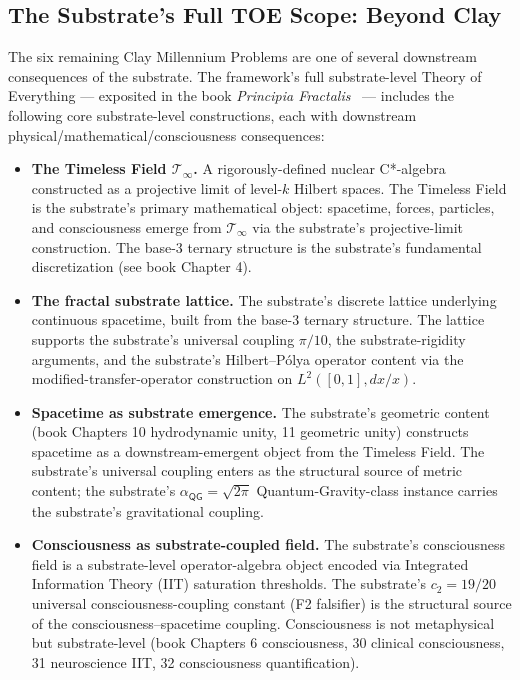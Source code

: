 \documentclass[11pt,a4paper]{amsart}
\theoremstyle{plain}
\theoremstyle{definition}
\begin{document}
\subsection{The Substrate's Full TOE Scope: Beyond Clay}\label{subsec:full-toe-scope}

The six remaining Clay Millennium Problems are one of several downstream consequences of the substrate. The framework's full substrate-level Theory of Everything --- exposited in the book \emph{Principia Fractalis}~\cite{cohen2026book} --- includes the following core substrate-level constructions, each with downstream physical/mathematical/consciousness consequences:

\begin{itemize}[itemsep=4pt,leftmargin=2em]
\item \textbf{The Timeless Field $\mathcal{T}_\infty$.} A rigorously-defined nuclear C*-algebra constructed as a projective limit of level-$k$ Hilbert spaces. The Timeless Field is the substrate's primary mathematical object: spacetime, forces, particles, and consciousness emerge from $\mathcal{T}_\infty$ via the substrate's projective-limit construction. The base-3 ternary structure is the substrate's fundamental discretization (see book Chapter 4).
\item \textbf{The fractal substrate lattice.} The substrate's discrete lattice underlying continuous spacetime, built from the base-3 ternary structure. The lattice supports the substrate's universal coupling $\pi/10$, the substrate-rigidity arguments, and the substrate's Hilbert--P\'olya operator content via the modified-transfer-operator construction on $L^2([0,1], dx/x)$.
\item \textbf{Spacetime as substrate emergence.} The substrate's geometric content (book Chapters 10 hydrodynamic unity, 11 geometric unity) constructs spacetime as a downstream-emergent object from the Timeless Field. The substrate's universal coupling enters as the structural source of metric content; the substrate's $\alpha_{\textsf{QG}} = \sqrt{2\pi}$ Quantum-Gravity-class instance carries the substrate's gravitational coupling.
\item \textbf{Consciousness as substrate-coupled field.} The substrate's consciousness field is a substrate-level operator-algebra object encoded via Integrated Information Theory (IIT) saturation thresholds. The substrate's $c_2 = 19/20$ universal consciousness-coupling constant (F2 falsifier) is the structural source of the consciousness--spacetime coupling. Consciousness is not metaphysical but substrate-level (book Chapters 6 consciousness, 30 clinical consciousness, 31 neuroscience IIT, 32 consciousness quantification).

\end{itemize}
\end{document}
